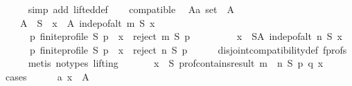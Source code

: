 \begin{isabellebody}
\ \ \ \ \isamarkupfalse%
\ {\isacharparenleft}{\kern0pt}simp\ add{\isacharcolon}{\kern0pt}\ lifted{\isacharunderscore}{\kern0pt}def{\isacharparenright}{\kern0pt}\isanewline
\ \ \isamarkupfalse%
\ compatible\ \isamarkupfalse%
\ A{\isacharcolon}{\kern0pt}{\isacharcolon}{\kern0pt}{\isachardoublequoteopen}{\isacharprime}{\kern0pt}a\ set{\isachardoublequoteclose}\ \ A{\isacharcolon}{\kern0pt}\isanewline
\ \ \ \ {\isachardoublequoteopen}A\ {\isasymsubseteq}\ S\ {\isasymand}\ {\isacharparenleft}{\kern0pt}{\isasymforall}x\ {\isasymin}\ A{\isachardot}{\kern0pt}\ indep{\isacharunderscore}{\kern0pt}of{\isacharunderscore}{\kern0pt}alt\ m\ S\ x\ {\isasymand}\isanewline
\ \ \ \ \ \ {\isacharparenleft}{\kern0pt}{\isasymforall}p{\isachardot}{\kern0pt}\ finite{\isacharunderscore}{\kern0pt}profile\ S\ p\ {\isasymlongrightarrow}\ x\ {\isasymin}\ reject\ m\ S\ p{\isacharparenright}{\kern0pt}{\isacharparenright}{\kern0pt}\ {\isasymand}\isanewline
\ \ \ \ \ \ \ \ {\isacharparenleft}{\kern0pt}{\isasymforall}x\ {\isasymin}\ S{\isacharminus}{\kern0pt}A{\isachardot}{\kern0pt}\ indep{\isacharunderscore}{\kern0pt}of{\isacharunderscore}{\kern0pt}alt\ n\ S\ x\ {\isasymand}\isanewline
\ \ \ \ \ \ {\isacharparenleft}{\kern0pt}{\isasymforall}p{\isachardot}{\kern0pt}\ finite{\isacharunderscore}{\kern0pt}profile\ S\ p\ {\isasymlongrightarrow}\ x\ {\isasymin}\ reject\ n\ S\ p{\isacharparenright}{\kern0pt}{\isacharparenright}{\kern0pt}{\isachardoublequoteclose}\isanewline
\ \ \ \ \isamarkupfalse%
\ disjoint{\isacharunderscore}{\kern0pt}compatibility{\isacharunderscore}{\kern0pt}def\ f{\isacharunderscore}{\kern0pt}profs\isanewline
\ \ \ \ \isamarkupfalse%
\ {\isacharparenleft}{\kern0pt}metis\ {\isacharparenleft}{\kern0pt}no{\isacharunderscore}{\kern0pt}types{\isacharcomma}{\kern0pt}\ lifting{\isacharparenright}{\kern0pt}{\isacharparenright}{\kern0pt}\isanewline
\ \ \isamarkupfalse%
\isanewline
\ \ \ \ {\isachardoublequoteopen}{\isasymforall}x\ {\isasymin}\ S{\isachardot}{\kern0pt}\ prof{\isacharunderscore}{\kern0pt}contains{\isacharunderscore}{\kern0pt}result\ {\isacharparenleft}{\kern0pt}m\ {\isasymparallel}\isactrlsub {\isasymup}\ n{\isacharparenright}{\kern0pt}\ S\ p\ q\ x{\isachardoublequoteclose}\isanewline
\ \ \isamarkupfalse%
\ cases\isanewline
\ \ \ \ \isamarkupfalse%
\ a{}{\isacharcolon}{\kern0pt}\ {\isachardoublequoteopen}x\ {\isasymin}\ A{\isachardoublequoteclose}\isanewline
\ \ \ \ \isamarkupfalse%

\end{isabellebody}
